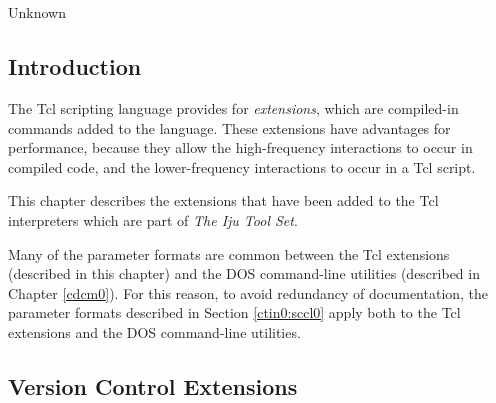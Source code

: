 
\chapter[\cxtnzeroshorttitle{}]{\cxtnzerolongtitle{}}

\label{cxtn0}

                   {Unknown}

\section{Introduction}
\label{cxtn0:sint0}

The Tcl scripting language provides for \emph{extensions}, which are
compiled-in commands added to the language.  These extensions have advantages
for performance, because they allow the high-frequency interactions to occur
in compiled code, and the lower-frequency interactions to occur in 
a Tcl script.

This chapter describes the extensions that have been added to the Tcl
interpreters which are part of \emph{The Iju Tool Set}.

Many of the parameter formats are common between the Tcl extensions
(described in this chapter) and the DOS command-line
utilities (described in Chapter
\cdcmzeroxrefhyphen{}\ref{cdcm0}).  For this reason, to avoid
redundancy of documentation, the parameter formats described
in Section \ctinzeroxrefhyphen{}\ref{ctin0:sccl0} apply both to the 
Tcl extensions
and the DOS command-line utilities.



\section{Version Control Extensions}


